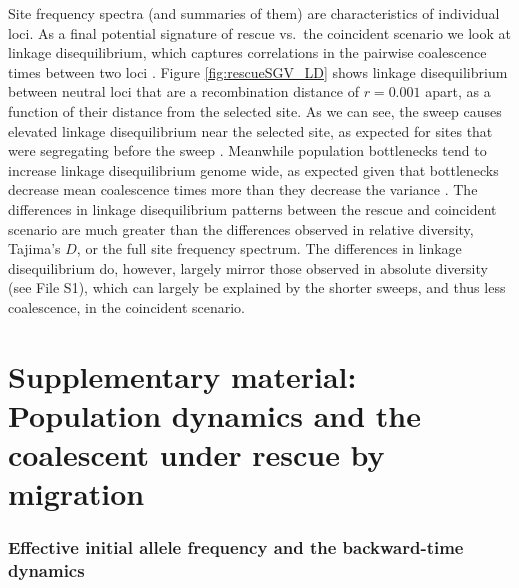 \documentclass[]{article}
\begin{document}
Site frequency spectra (and summaries of them) are characteristics of individual loci.
As a final potential signature of rescue vs.\ the coincident scenario we look at linkage disequilibrium, which captures correlations in the pairwise coalescence times between two loci \citep[][p.\ 236]{wakeley2009coalescent}.
Figure \ref{fig:rescueSGV_LD} shows linkage disequilibrium between neutral loci that are a recombination distance of $r=0.001$ apart, as a function of their distance from the selected site.
As we can see, the sweep causes elevated linkage disequilibrium near the selected site, as expected for sites that were segregating before the sweep \citep{kim2004linkage,mcvean2007structure}.
Meanwhile population bottlenecks tend to increase linkage disequilibrium genome wide, as expected given that bottlenecks decrease mean coalescence times more than they decrease the variance \citep{mcvean2002genealogical}.
The differences in linkage disequilibrium patterns between the rescue and coincident scenario are much greater than the differences observed in relative diversity, Tajima's $D$, or the full site frequency spectrum. 
The differences in linkage disequilibrium do, however, largely mirror those observed in absolute diversity (see File S1), which can largely be explained by the shorter sweeps, and thus less coalescence, in the coincident scenario.

\section*{Supplementary material: Population dynamics and the coalescent under rescue by migration}
\label{sec:extra_mig}

\subsubsection*{Effective initial allele frequency and the backward-time dynamics}
\end{document}
